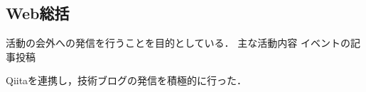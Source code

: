 \subsection*{Web総括}


活動の会外への発信を行うことを目的としている．
主な活動内容
    イベントの記事投稿

    
Qiitaを連携し，技術ブログの発信を積極的に行った．
